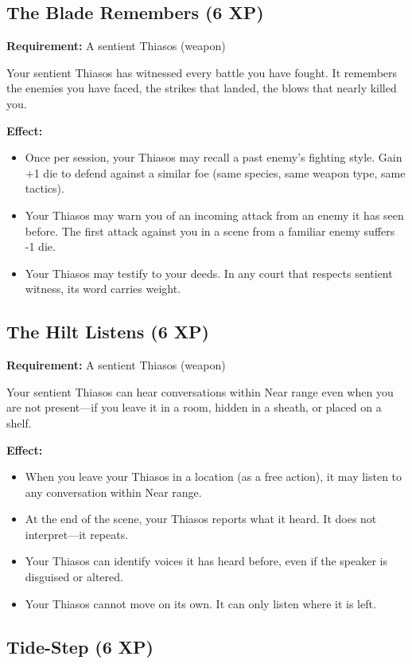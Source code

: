 \subsection{The Blade Remembers (6 XP)}

\textbf{Requirement:} A sentient Thiasos (weapon)

Your sentient Thiasos has witnessed every battle you have fought. It remembers the enemies you have faced, the strikes that landed, the blows that nearly killed you.

\textbf{Effect:}
\begin{itemize}
\item Once per session, your Thiasos may recall a past enemy's fighting style. Gain +1 die to defend against a similar foe (same species, same weapon type, same tactics).
\item Your Thiasos may warn you of an incoming attack from an enemy it has seen before. The first attack against you in a scene from a familiar enemy suffers -1 die.
\item Your Thiasos may testify to your deeds. In any court that respects sentient witness, its word carries weight.
\end{itemize}

\subsection{The Hilt Listens (6 XP)}

\textbf{Requirement:} A sentient Thiasos (weapon)

Your sentient Thiasos can hear conversations within Near range even when you are not present—if you leave it in a room, hidden in a sheath, or placed on a shelf.

\textbf{Effect:}
\begin{itemize}
\item When you leave your Thiasos in a location (as a free action), it may listen to any conversation within Near range.
\item At the end of the scene, your Thiasos reports what it heard. It does not interpret—it repeats.
\item Your Thiasos can identify voices it has heard before, even if the speaker is disguised or altered.
\item Your Thiasos cannot move on its own. It can only listen where it is left.
\end{itemize}

\subsection{Tide-Step (6 XP)}

